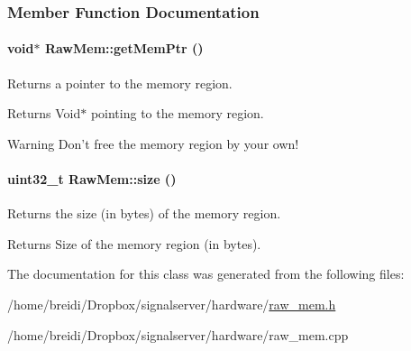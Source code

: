 \subsubsection{Member Function Documentation}
\hypertarget{class_raw_mem_ada23879e8477b62fb50a2e09d99a1685}{
\paragraph[{getMemPtr}]{\setlength{\rightskip}{0pt plus 5cm}void$\ast$ RawMem::getMemPtr ()}\hfill}
\label{class_raw_mem_ada23879e8477b62fb50a2e09d99a1685}


Returns a pointer to the memory region. \begin{DoxyReturn}{Returns}
Void$\ast$ pointing to the memory region. 
\end{DoxyReturn}
\begin{DoxyWarning}{Warning}
Don't free the memory region by your own! 
\end{DoxyWarning}
\hypertarget{class_raw_mem_a07bb8d59d7f06f3a05df00ec8ab1aff9}{
\paragraph[{size}]{\setlength{\rightskip}{0pt plus 5cm}uint32\_\-t RawMem::size ()}\hfill}
\label{class_raw_mem_a07bb8d59d7f06f3a05df00ec8ab1aff9}


Returns the size (in bytes) of the memory region. \begin{DoxyReturn}{Returns}
Size of the memory region (in bytes). 
\end{DoxyReturn}


The documentation for this class was generated from the following files:\begin{DoxyCompactItemize}
\item 
/home/breidi/Dropbox/signalserver/hardware/\hyperlink{raw__mem_8h}{raw\_\-mem.h}\item 
/home/breidi/Dropbox/signalserver/hardware/raw\_\-mem.cpp\end{DoxyCompactItemize}
